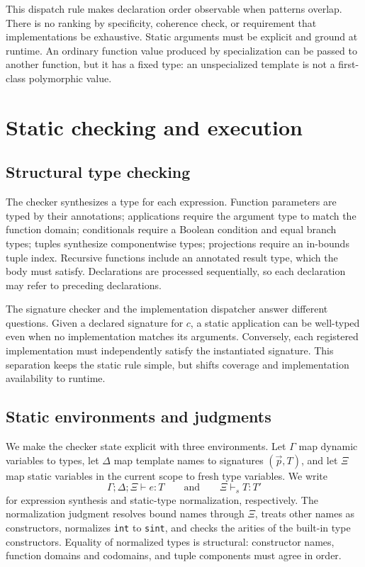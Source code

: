 \documentclass[11pt]{article}
\begin{document}
This dispatch rule makes declaration order observable when patterns overlap.
There is no ranking by specificity, coherence check, or requirement that
implementations be exhaustive. Static arguments must be explicit and ground
at runtime. An ordinary function value produced by specialization can be
passed to another function, but it has a fixed type: an unspecialized template
is not a first-class polymorphic value.

\section{Static checking and execution}

\subsection{Structural type checking}

The checker synthesizes a type for each expression. Function parameters are
typed by their annotations; applications require the argument type to match
the function domain; conditionals require a Boolean condition and equal
branch types; tuples synthesize componentwise types; projections require an
in-bounds tuple index. Recursive functions include an annotated result type,
which the body must satisfy. Declarations are processed sequentially, so each
declaration may refer to preceding declarations.

The signature checker and the implementation dispatcher answer different
questions. Given a declared signature for \(c\), a static application can be
well-typed even when no implementation matches its arguments. Conversely,
each registered implementation must independently satisfy the instantiated
signature. This separation keeps the static rule simple, but shifts coverage
and implementation availability to runtime.

\subsection{Static environments and judgments}

We make the checker state explicit with three environments. Let \(\Gamma\)
map dynamic variables to types, let \(\Delta\) map template names to
signatures \((\vec p,T)\), and let \(\Xi\) map static variables in the
current scope to fresh type variables. We write
\[
  \Gamma;\Delta;\Xi \vdash e:T
  \qquad\text{and}\qquad
  \Xi \vdash_s T:T'
\]
for expression synthesis and static-type normalization, respectively. The
normalization judgment resolves bound names through \(\Xi\), treats other
names as constructors, normalizes \texttt{int} to \texttt{sint}, and checks
the arities of the built-in type constructors. Equality of normalized types
is structural: constructor names, function domains and codomains, and tuple
components must agree in order.
\end{document}
